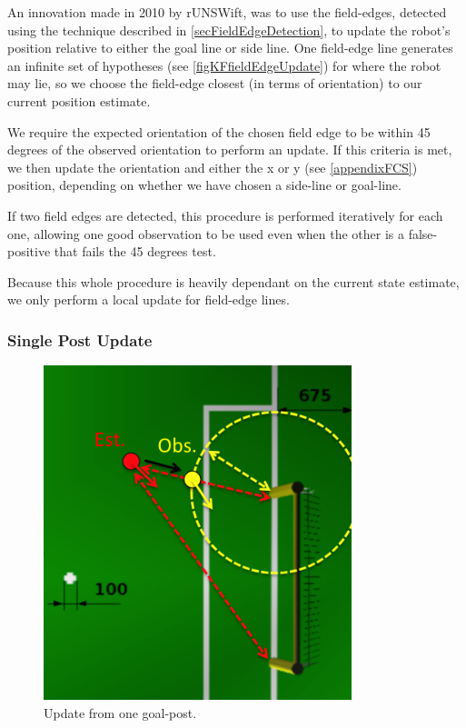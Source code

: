 \documentclass[pdftex,11pt,a4paper]{report}
\begin{document}
An innovation made in 2010 by rUNSWift, was to use the field-edges, detected using the technique described in \autoref{secFieldEdgeDetection}, to update the robot's position relative to either the goal line or side line. One field-edge line generates an infinite set of hypotheses (see \autoref{figKFfieldEdgeUpdate}) for where the robot may lie, so we choose the field-edge closest (in terms of orientation) to our current position estimate.

We require the expected orientation of the chosen field edge to be within 45 degrees of the observed orientation to perform an update. If this criteria is met, we then update the orientation and either the x or y (see \autoref{appendixFCS}) position, depending on whether we have chosen a side-line or goal-line.

If two field edges are detected, this procedure is performed iteratively for each one, allowing one good observation to be used even when the other is a false-positive that fails the 45 degrees test.

Because this whole procedure is heavily dependant on the current state estimate, we only perform a local update for field-edge lines.

\subsubsection{Single Post Update}

\begin{figure} [ht]
\centering
\includegraphics[width=0.8\textwidth]{figures/KFonePostUpdate}
\caption{Update from one goal-post.} \label{figKFonePostUpdate}
\end{figure}
\end{document}
